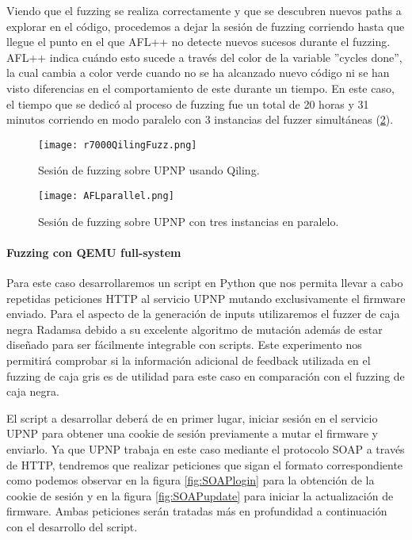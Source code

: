 Viendo que el fuzzing se realiza correctamente y que se descubren nuevos paths a explorar en el código, procedemos a dejar la 
sesión de fuzzing corriendo hasta que llegue el punto en el que AFL++ no detecte nuevos sucesos durante el fuzzing. AFL++ indica cuándo
esto sucede a través del color de la variable ''cycles done'', la cual cambia a color verde cuando no se ha alcanzado nuevo código 
ni se han visto diferencias en el comportamiento de este durante un tiempo. En este caso, el tiempo que se dedicó al proceso de fuzzing 
fue un total de 20 horas y 31 minutos corriendo en modo paralelo con 3 instancias del fuzzer simultáneas (\ref{fig:R7000parallel}).

\begin{figure}[H]
    \centering
    \texttt{[image: r7000QilingFuzz.png]}
    \caption{Sesión de fuzzing sobre UPNP usando Qiling.}
    \label{fig:R7000QilingFuzz}
\end{figure}

\begin{figure}[H]
    \centering
    \texttt{[image: AFLparallel.png]}
    \caption{Sesión de fuzzing sobre UPNP con tres instancias en paralelo.}
    \label{fig:R7000parallel}
\end{figure}

\paragraph{Fuzzing con QEMU full-system}
Para este caso desarrollaremos un script en Python que nos permita llevar a cabo repetidas peticiones HTTP
al servicio UPNP mutando exclusivamente el firmware enviado. Para el aspecto de la generación de
inputs utilizaremos el fuzzer de caja negra Radamsa\cite{radamsa} debido a su excelente algoritmo 
de mutación además de estar diseñado para ser fácilmente integrable con scripts. Este experimento nos 
permitirá comprobar si la información adicional de feedback utilizada en el fuzzing de caja gris es 
de utilidad para este caso en comparación con el fuzzing de caja negra.\bigskip

El script a desarrollar deberá de en primer lugar, iniciar sesión en el servicio UPNP para obtener una cookie de sesión
previamente a mutar el firmware y enviarlo. Ya que UPNP trabaja en este caso mediante el protocolo SOAP a través de HTTP,
tendremos que realizar peticiones que sigan el formato correspondiente como podemos observar en la figura \ref{fig:SOAPlogin}
para la obtención de la cookie de sesión y en la figura \ref{fig:SOAPupdate} para iniciar la actualización de firmware.
Ambas peticiones serán tratadas más en profundidad a continuación con el desarrollo del script.


